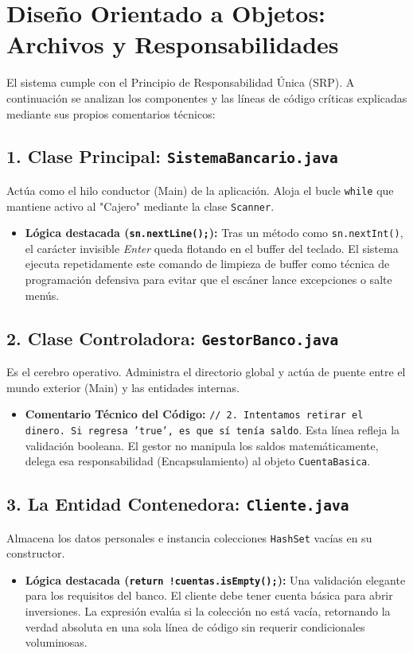 \documentclass[12pt, letterpaper]{article}
\begin{document}
	\section{Diseño Orientado a Objetos: Archivos y Responsabilidades}
	El sistema cumple con el Principio de Responsabilidad Única (SRP). A continuación se analizan los componentes y las líneas de código críticas explicadas mediante sus propios comentarios técnicos:
	
	\subsection{1. Clase Principal: \texttt{SistemaBancario.java}}
	Actúa como el hilo conductor (Main) de la aplicación. Aloja el bucle \texttt{while} que mantiene activo al "Cajero" mediante la clase \texttt{Scanner}.
	\begin{itemize}
		\item \textbf{Lógica destacada (\texttt{sn.nextLine();}):} Tras un método como \texttt{sn.nextInt()}, el carácter invisible \textit{Enter} queda flotando en el buffer del teclado. El sistema ejecuta repetidamente este comando de limpieza de buffer como técnica de programación defensiva para evitar que el escáner lance excepciones o salte menús.
	\end{itemize}
	
	\subsection{2. Clase Controladora: \texttt{GestorBanco.java}}
	Es el cerebro operativo. Administra el directorio global y actúa de puente entre el mundo exterior (Main) y las entidades internas. 
	\begin{itemize}
		\item \textbf{Comentario Técnico del Código:} \texttt{// 2. Intentamos retirar el dinero. Si regresa 'true', es que sí tenía saldo}. Esta línea refleja la validación booleana. El gestor no manipula los saldos matemáticamente, delega esa responsabilidad (Encapsulamiento) al objeto \texttt{CuentaBasica}.
	\end{itemize}
	
	\subsection{3. La Entidad Contenedora: \texttt{Cliente.java}}
	Almacena los datos personales e instancia colecciones \texttt{HashSet} vacías en su constructor.
	\begin{itemize}
		\item \textbf{Lógica destacada (\texttt{return !cuentas.isEmpty();}):} Una validación elegante para los requisitos del banco. El cliente debe tener cuenta básica para abrir inversiones. La expresión evalúa si la colección no está vacía, retornando la verdad absoluta en una sola línea de código sin requerir condicionales voluminosas.
	\end{itemize}
	
\end{document}
